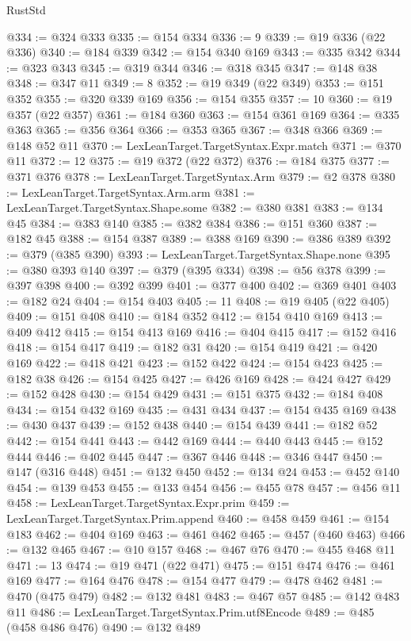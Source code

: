 \begin{lexlean}{RustStd}
\begin{coremodule}
{\begin{coremodule}
{{{{{{{{{{{{{{{{{{{{{{{{{{{{{{{{{{{{{{{{{{{{{{{{{{{{{{{{{{{{{{{{{{{{{{{{{{{{{{{{@334 := @324 @333
@335 := @154 @334
@336 := 9
@339 := @19 @336 (@22 @336)
@340 := @184 @339
@342 := @154 @340 @169
@343 := @335 @342
@344 := @323 @343
@345 := @319 @344
@346 := @318 @345
@347 := @148 @38
@348 := @347 @11
@349 := 8
@352 := @19 @349 (@22 @349)
@353 := @151 @352
@355 := @320 @339 @169
@356 := @154 @355
@357 := 10
@360 := @19 @357 (@22 @357)
@361 := @184 @360
@363 := @154 @361 @169
@364 := @335 @363
@365 := @356 @364
@366 := @353 @365
@367 := @348 @366
@369 := @148 @52 @11
@370 := LexLeanTarget.TargetSyntax.Expr.match
@371 := @370 @11
@372 := 12
@375 := @19 @372 (@22 @372)
@376 := @184 @375
@377 := @371 @376
@378 := LexLeanTarget.TargetSyntax.Arm
@379 := @2 @378
@380 := LexLeanTarget.TargetSyntax.Arm.arm
@381 := LexLeanTarget.TargetSyntax.Shape.some
@382 := @380 @381
@383 := @134 @45
@384 := @383 @140
@385 := @382 @384
@386 := @151 @360
@387 := @182 @45
@388 := @154 @387
@389 := @388 @169
@390 := @386 @389
@392 := @379 (@385 @390)
@393 := LexLeanTarget.TargetSyntax.Shape.none
@395 := @380 @393 @140
@397 := @379 (@395 @334)
@398 := @56 @378
@399 := @397 @398
@400 := @392 @399
@401 := @377 @400
@402 := @369 @401
@403 := @182 @24
@404 := @154 @403
@405 := 11
@408 := @19 @405 (@22 @405)
@409 := @151 @408
@410 := @184 @352
@412 := @154 @410 @169
@413 := @409 @412
@415 := @154 @413 @169
@416 := @404 @415
@417 := @152 @416
@418 := @154 @417
@419 := @182 @31
@420 := @154 @419
@421 := @420 @169
@422 := @418 @421
@423 := @152 @422
@424 := @154 @423
@425 := @182 @38
@426 := @154 @425
@427 := @426 @169
@428 := @424 @427
@429 := @152 @428
@430 := @154 @429
@431 := @151 @375
@432 := @184 @408
@434 := @154 @432 @169
@435 := @431 @434
@437 := @154 @435 @169
@438 := @430 @437
@439 := @152 @438
@440 := @154 @439
@441 := @182 @52
@442 := @154 @441
@443 := @442 @169
@444 := @440 @443
@445 := @152 @444
@446 := @402 @445
@447 := @367 @446
@448 := @346 @447
@450 := @147 (@316 @448)
@451 := @132 @450
@452 := @134 @24
@453 := @452 @140
@454 := @139 @453
@455 := @133 @454
@456 := @455 @78
@457 := @456 @11
@458 := LexLeanTarget.TargetSyntax.Expr.prim
@459 := LexLeanTarget.TargetSyntax.Prim.append
@460 := @458 @459
@461 := @154 @183
@462 := @404 @169
@463 := @461 @462
@465 := @457 (@460 @463)
@466 := @132 @465
@467 := @10 @157
@468 := @467 @76
@470 := @455 @468 @11
@471 := 13
@474 := @19 @471 (@22 @471)
@475 := @151 @474
@476 := @461 @169
@477 := @164 @476
@478 := @154 @477
@479 := @478 @462
@481 := @470 (@475 @479)
@482 := @132 @481
@483 := @467 @57
@485 := @142 @483 @11
@486 := LexLeanTarget.TargetSyntax.Prim.utf8Encode
@489 := @485 (@458 @486 @476)
@490 := @132 @489
}}}}}}}}}}}}}}}}}}}}}}}}}}}}}}}}}}}}}}}}}}}}}}}}}}}}}}}}}}}}}}}}}}}}}}}}}}}}}}}}
\end{coremodule}}
\end{coremodule}
\end{lexlean}
